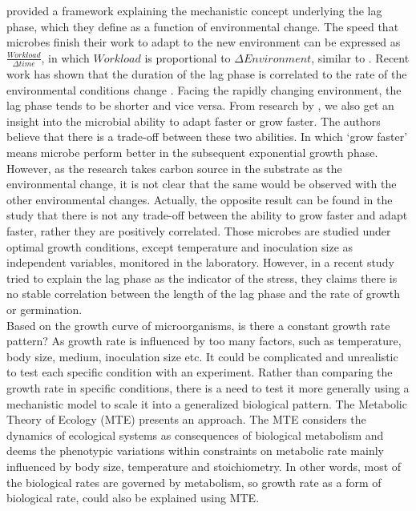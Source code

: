 \documentclass[a4paper]{article}
\begin{document}
\citealt{swinnen2004predictive} provided a framework explaining the mechanistic concept underlying the lag phase, which they define as a function of environmental change. The speed that microbes finish their work to adapt to the new environment can be expressed as $\frac{Workload}{\Delta time}$, in which $Workload$ is proportional to $\Delta Environment$, similar to \citealt{bertrand2019lag}. Recent work has shown that the duration of the lag phase is correlated to the rate of the environmental conditions change \citep{chu2016lag}. Facing the rapidly changing environment, the lag phase tends to be shorter and vice versa. From research by \citealt{chu2016lag}, we also get an insight into the microbial ability to adapt faster or grow faster. The authors believe that there is a trade-off between these two abilities. In which `grow faster' means microbe perform better in the subsequent exponential growth phase. However, as the research \citealt{chu2016lag} takes carbon source in the substrate as the environmental change, it is not clear that the same would be observed with the other environmental changes. Actually, the opposite result can be found in the study \citep{de2018determination} that there is not any trade-off between the ability to grow faster and adapt faster, rather they are positively correlated. Those microbes are studied under optimal growth conditions, except temperature and inoculation size as independent variables, monitored in the laboratory. However, in a recent study \citealt{hamill2020microbial} tried to explain the lag phase as the indicator of the stress, they claims there is no stable correlation between the length of the lag phase and the rate of growth or germination. \\


Based on the growth curve of microorganisms, is there a constant growth rate pattern? As growth rate is influenced by too many factors, such as temperature, body size, medium, inoculation size etc. It could be complicated and unrealistic to test each specific condition with an experiment. Rather than comparing the growth rate in specific conditions, there is a need to test it more generally using a mechanistic model to scale it into a generalized biological pattern. The Metabolic Theory of Ecology (MTE) \citep{brown2004toward} presents an approach. The MTE considers the dynamics of ecological systems as consequences of biological metabolism and deems the phenotypic variations within constraints on metabolic rate mainly influenced by body size, temperature and stoichiometry. In other words, most of the biological rates are governed by metabolism, so growth rate as a form of biological rate, could also be explained using MTE. \\
\end{document}
